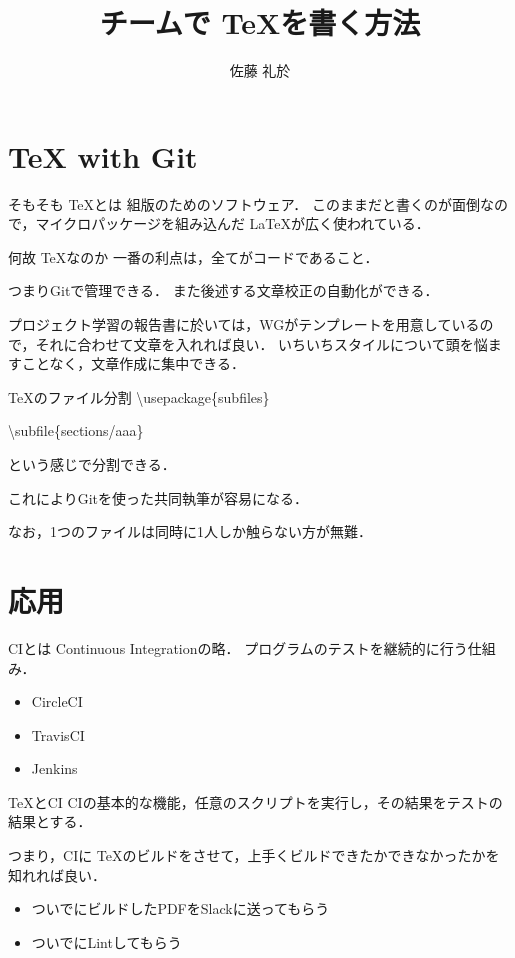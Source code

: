 \documentclass{beamer}
\title{チームで \TeX を書く方法}
\author{佐藤 礼於}
\begin{document}
\maketitle

\section{TeX with Git}

\begin{frame}{そもそも \TeX とは}
  組版のためのソフトウェア．
  このままだと書くのが面倒なので，マイクロパッケージを組み込んだ \LaTeX が広く使われている．
\end{frame}

\begin{frame}{何故 \TeX なのか}
  一番の利点は，全てがコードであること．

  つまりGitで管理できる．
  また後述する文章校正の自動化ができる．

  プロジェクト学習の報告書に於いては，WGがテンプレートを用意しているので，それに合わせて文章を入れれば良い．
  いちいちスタイルについて頭を悩ますことなく，文章作成に集中できる．
\end{frame}

\begin{frame}{\TeX のファイル分割}
  \textbackslash usepackage\{subfiles\}

  \textbackslash subfile\{sections/aaa\}

  という感じで分割できる．

  これによりGitを使った共同執筆が容易になる．

  なお，1つのファイルは同時に1人しか触らない方が無難．
\end{frame}


\section{応用}

\begin{frame}{CIとは}
  Continuous Integrationの略．
  プログラムのテストを継続的に行う仕組み．

  \begin{itemize}
    \item CircleCI
    \item TravisCI
    \item Jenkins
  \end{itemize}
\end{frame}

\begin{frame}{\TeX とCI}
  CIの基本的な機能，任意のスクリプトを実行し，その結果をテストの結果とする．

  つまり，CIに \TeX のビルドをさせて，上手くビルドできたかできなかったかを知れれば良い．

  \begin{itemize}
    \item ついでにビルドしたPDFをSlackに送ってもらう
    \item ついでにLintしてもらう
  \end{itemize}
\end{frame}
\end{document}
